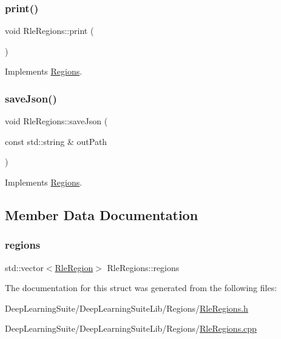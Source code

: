 \mbox{\label{struct_rle_regions_a83e335ebc08dd7029bdc76baa8b71b32}} 
\subsubsection{\texorpdfstring{print()}{print()}}
{\footnotesize\ttfamily void Rle\+Regions\+::print (\begin{DoxyParamCaption}{ }\end{DoxyParamCaption})\hspace{0.3cm}{\ttfamily [virtual]}}



Implements \hyperlink{struct_regions_a5a19f40bc0d2226f244625b88fbf8e59}{Regions}.

\mbox{\label{struct_rle_regions_a643c55d59720ba45a78e0e6090018e05}} 
\subsubsection{\texorpdfstring{save\+Json()}{saveJson()}}
{\footnotesize\ttfamily void Rle\+Regions\+::save\+Json (\begin{DoxyParamCaption}\item[{const std\+::string \&}]{out\+Path }\end{DoxyParamCaption})\hspace{0.3cm}{\ttfamily [virtual]}}



Implements \hyperlink{struct_regions_a402078d4ff67e4aee31b231c2d1942c6}{Regions}.



\subsection{Member Data Documentation}
\mbox{\label{struct_rle_regions_a49c81f3a73376196ac33e70d2a49b867}} 
\subsubsection{\texorpdfstring{regions}{regions}}
{\footnotesize\ttfamily std\+::vector$<$\hyperlink{struct_rle_region}{Rle\+Region}$>$ Rle\+Regions\+::regions}



The documentation for this struct was generated from the following files\+:\begin{DoxyCompactItemize}
\item 
Deep\+Learning\+Suite/\+Deep\+Learning\+Suite\+Lib/\+Regions/\hyperlink{_rle_regions_8h}{Rle\+Regions.\+h}\item 
Deep\+Learning\+Suite/\+Deep\+Learning\+Suite\+Lib/\+Regions/\hyperlink{_rle_regions_8cpp}{Rle\+Regions.\+cpp}\end{DoxyCompactItemize}
